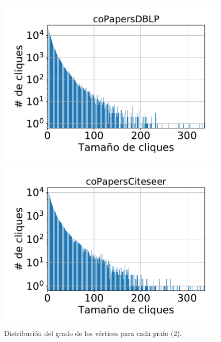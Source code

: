 \begin{frame}
\begin{figure}
    	\begin{minipage}{1\textwidth}
    		\centering
    		\begin{minipage}{0.45\textwidth}
    			\centering
    			\includegraphics[width=1\linewidth]{../img/cliqueDist2/coPapersDBLP.pdf}
    		\end{minipage}
    		\begin{minipage}{0.45\textwidth}
    			\centering
    			\includegraphics[width=1\linewidth]{../img/cliqueDist2/coPapersCiteseer.pdf}
    		\end{minipage}  
    	\end{minipage}	

    \caption{Distribución del grado de los vértices para cada grafo (2).}
\end{figure}

\end{frame}



